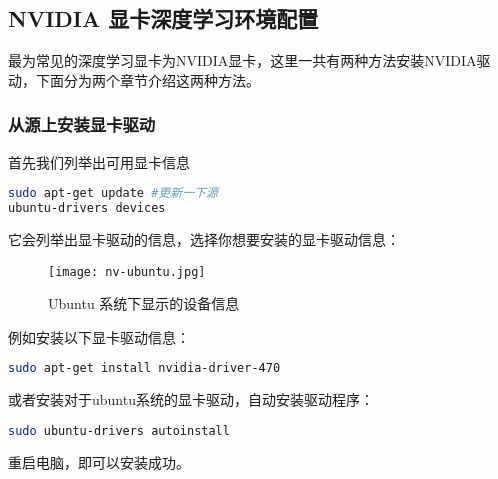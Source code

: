 \documentclass[lang=cn,a4paper,newtx]{elegantpaper}
\begin{document}
\subsection{NVIDIA 显卡深度学习环境配置}
最为常见的深度学习显卡为NVIDIA显卡，这里一共有两种方法安装NVIDIA驱动，下面分为两个章节介绍这两种方法。

\subsubsection{从源上安装显卡驱动}
首先我们列举出可用显卡信息

\begin{lstlisting}[language=bash]
sudo apt-get update #更新一下源
ubuntu-drivers devices
\end{lstlisting}

它会列举出显卡驱动的信息，选择你想要安装的显卡驱动信息：
\begin{figure}[hbpt]
  \centering
  \texttt{[image: nv-ubuntu.jpg]}
  \caption{Ubuntu 系统下显示的设备信息}
  \label{fig:nv-ubuntu}
\end{figure}

例如安装以下显卡驱动信息：
\begin{lstlisting}[language=bash]
sudo apt-get install nvidia-driver-470
\end{lstlisting}

或者安装对于ubuntu系统的显卡驱动，自动安装驱动程序：
\begin{lstlisting}[language=bash]
sudo ubuntu-drivers autoinstall
\end{lstlisting}

重启电脑，即可以安装成功。
\end{document}
